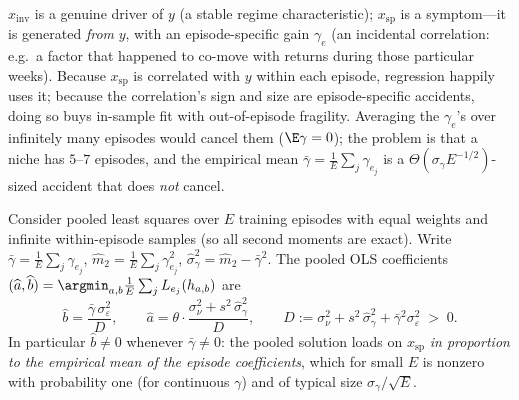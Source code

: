 \begin{intuition}
$x_{\mathrm{inv}}$ is a genuine driver of $y$ (a stable regime
characteristic); $x_{\mathrm{sp}}$ is a symptom---it is generated \emph{from}
$y$, with an episode-specific gain $\gamma_e$ (an incidental correlation:
e.g.\ a factor that happened to co-move with returns during those particular
weeks). Because $x_{\mathrm{sp}}$ is correlated with $y$ within each episode,
regression happily uses it; because the correlation's sign and size are
episode-specific accidents, doing so buys in-sample fit with out-of-episode
fragility. Averaging the $\gamma_e$'s over infinitely many episodes would
cancel them ($\E\gamma = 0$); the problem is that a niche has $5$--$7$
episodes, and the empirical mean $\bar{\gamma} = \frac{1}{E}\sum_j
\gamma_{e_j}$ is a $\Theta(\sigma_\gamma E^{-1/2})$-sized accident that does
\emph{not} cancel.
\end{intuition}

\begin{proposition}
\label{prop:dd1-pooled-ols}
Consider pooled least squares over $E$ training episodes with equal weights
and infinite within-episode samples (so all second moments are exact). Write
$\bar{\gamma} = \frac{1}{E}\sum_{j} \gamma_{e_j}$,
$\widehat{m}_2 = \frac{1}{E}\sum_j \gamma_{e_j}^2$,
$\widehat{\sigma}_\gamma^2 = \widehat{m}_2 - \bar{\gamma}^2$. The pooled OLS
coefficients $(\widehat{a}, \widehat{b}) = \argmin_{a, b} \frac{1}{E}
\sum_j L_{e_j}(h_{a,b})$ are
\begin{equation}
\label{eq:dd1-pooled-limit}
\widehat{b}
= \frac{\bar{\gamma}\, \sigma_\varepsilon^2}{D},
\qquad
\widehat{a}
= \theta \cdot \frac{\sigma_\nu^2 + s^2\, \widehat{\sigma}_\gamma^2}{D},
\qquad
D := \sigma_\nu^2 + s^2\, \widehat{\sigma}_\gamma^2
+ \bar{\gamma}^2 \sigma_\varepsilon^2 \;>\; 0.
\end{equation}
In particular $\widehat{b} \neq 0$ whenever $\bar{\gamma} \neq 0$: the pooled
solution loads on $x_{\mathrm{sp}}$ \emph{in proportion to the empirical mean
of the episode coefficients}, which for small $E$ is nonzero with
probability one (for continuous $\gamma$) and of typical size
$\sigma_\gamma / \sqrt{E}$.
\end{proposition}

